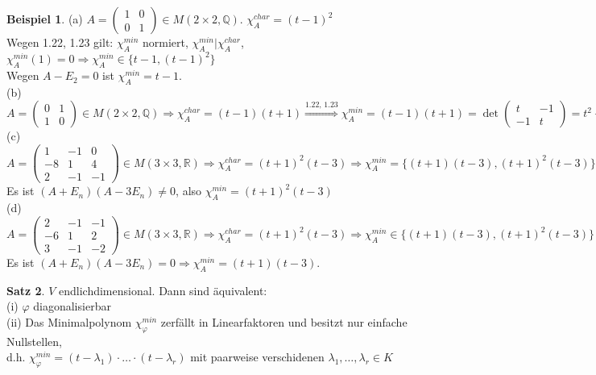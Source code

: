 \documentclass[10pt,a4paper,numbers=endperiod]{scrartcl}
\theoremstyle{definition}
\newtheorem{satz}{Satz}[section]
\newtheorem{bsp}[satz]{Beispiel}
\def\QQ{{\mathbb Q}}
\def\RR{{\mathbb R}}
\begin{document}
\begin{bsp}
	(a) $A = \begin{pmatrix}
	1 & 0\\
	0 & 1
	\end{pmatrix} \in M(2 \times 2, \QQ)$. $\chi_A^{char} = (t-1)^2$\\
	Wegen 1.22, 1.23 gilt: $\chi_A^{min}$ normiert, $\chi_A^{min} | \chi_A^{char}$, $\chi_A^{min} (1) = 0 \Rightarrow \chi_A^{min} \in \{t-1, (t-1)^2\}$\\
	Wegen $A-E_2 = 0$ ist $\chi_A^{min} = t-1$.\\
	(b) $A = \begin{pmatrix}
	0 & 1\\
	1 & 0
	\end{pmatrix} \in M(2 \times 2, \QQ) \Rightarrow \chi_A^{char} = (t-1)(t+1) \overset{\text{1.22, 1.23}}{\Rightarrow} \chi_A^{min} = (t-1)(t+1) = \det \begin{pmatrix}
	t & -1\\
	-1 & t
	\end{pmatrix} = t^2 -1$\\
	(c) $A = \begin{pmatrix}
	1 & -1 & 0\\
	-8 & 1 & 4\\
	2 & -1 & -1
	\end{pmatrix} \in M(3 \times 3, \RR) \Rightarrow \chi_A^{char} = (t+1)^2(t-3) \Rightarrow \chi_A^{min} = \{(t+1)(t-3), (t+1)^2(t-3)\}$\\ Es ist $(A+E_n)(A-3E_n) \neq 0$, also $\chi_A^{min} = (t+1)^2(t-3)$\\
	(d) $A = \begin{pmatrix}
	2 & -1 & -1\\
	-6 & 1 & 2\\
	3 & -1 & -2
	\end{pmatrix} \in M(3 \times 3, \RR) \Rightarrow \chi_A^{char} = (t+1)^2(t-3) \Rightarrow \chi_A^{min} \in \{(t+1)(t-3), (t+1)^2(t-3)\}$\\ Es ist $(A+E_n)(A-3E_n) = 0 \Rightarrow \chi_A^{min} = (t+1)(t-3)$. 
\end{bsp}

\begin{satz}
	$V$ endlichdimensional. Dann sind äquivalent:\\
	(i) $\varphi$ diagonalisierbar\\
	(ii) Das Minimalpolynom $\chi_\varphi^{min}$ zerfällt in Linearfaktoren und besitzt nur einfache Nullstellen,\\ d.h. $\chi_\varphi^{min} = (t-\lambda_1) \cdot \ldots \cdot(t-\lambda_r)$ mit paarweise verschidenen $\lambda_1, \ldots, \lambda_r \in K$
\end{satz}
\end{document}
